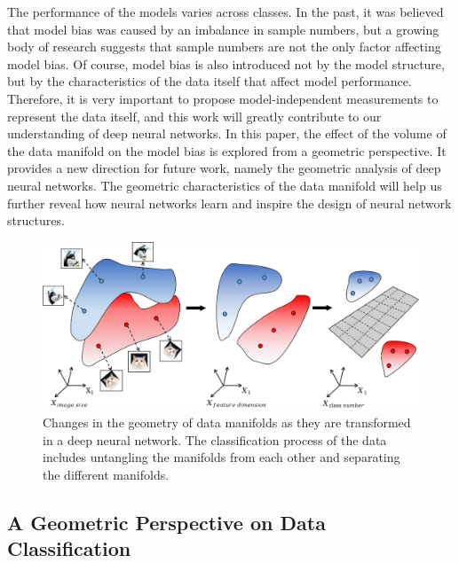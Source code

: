 \documentclass[10pt]{article} %
\begin{document}
The performance of the models varies across classes. In the past, it was believed that model bias was caused by an imbalance in sample numbers, but a growing body of research suggests that sample numbers are not the only factor affecting model bias. Of course, model bias is also introduced not by the model structure, but by the characteristics of the data itself that affect model performance. Therefore, it is very important to propose model-independent measurements to represent the data itself, and this work will greatly contribute to our understanding of deep neural networks. In this paper, the effect of the volume of the data manifold on the model bias is explored from a geometric perspective. It provides a new direction for future work, namely the geometric analysis of deep neural networks. The geometric characteristics of the data manifold will help us further reveal how neural networks learn and inspire the design of neural network structures.

\begin{figure}[h]%
\begin{center}
\vskip -0.05in
\includegraphics[width=1\columnwidth]{fig24}
\vskip -0.1in
\caption{Changes in the geometry of data manifolds as they are transformed in a deep neural network. The classification process of the data includes untangling the manifolds from each other and separating the different manifolds.}
\label{fig25}
\end{center}
\vskip -0.1in
\end{figure}

\subsection{A Geometric Perspective on Data Classification\label{J.2}}
\end{document}
